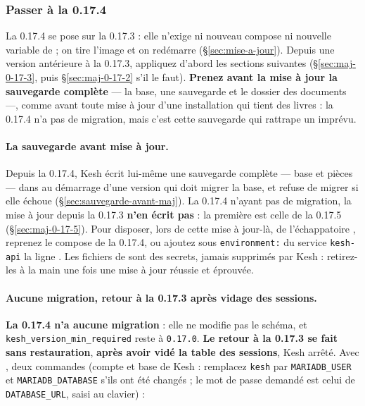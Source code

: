 \documentclass[a4paper,11pt,oneside]{article}
\begin{document}
\subsubsection{Passer à la 0.17.4}\label{sec:maj-0-17-4}

La 0.17.4 se pose sur la 0.17.3 : elle n'exige ni nouveau compose ni nouvelle variable de  ; on tire l'image et on redémarre (\S\ref{sec:mise-a-jour}). Depuis une version antérieure à la 0.17.3, appliquez d'abord les sections suivantes (\S\ref{sec:maj-0-17-3}, puis \S\ref{sec:maj-0-17-2} s'il le faut). \textbf{Prenez avant la mise à jour la sauvegarde complète} --- la base, une sauvegarde  et le dossier des documents ---, comme avant toute mise à jour d'une installation qui tient des livres : la 0.17.4 n'a pas de migration, mais c'est cette sauvegarde qui rattrape un imprévu.

\begin{sloppypar}
\paragraph{La sauvegarde avant mise à jour.} Depuis la 0.17.4, Kesh écrit lui-même une sauvegarde complète --- base et pièces --- dans  au démarrage d'une version qui doit migrer la base, et refuse de migrer si elle échoue (\S\ref{sec:sauvegarde-avant-maj}). La 0.17.4 n'ayant pas de migration, la mise à jour depuis la 0.17.3 \textbf{n'en écrit pas} : la première est celle de la 0.17.5 (\S\ref{sec:maj-0-17-5}). Pour disposer, lors de cette mise à jour-là, de l'échappatoire , reprenez le compose de la 0.17.4, ou ajoutez sous \texttt{environment:} du service \texttt{kesh-api} la ligne . Les fichiers de  sont des secrets, jamais supprimés par Kesh : retirez-les à la main une fois une mise à jour réussie et éprouvée.
\end{sloppypar}

\begin{sloppypar}
\paragraph{Aucune migration, retour à la 0.17.3 après vidage des sessions.} \textbf{La 0.17.4 n'a aucune migration} : elle ne modifie pas le schéma, et \texttt{kesh\_version\_min\_required} reste à \texttt{0.17.0}. \textbf{Le retour à la 0.17.3 se fait sans restauration}, \textbf{après avoir vidé la table des sessions}, Kesh arrêté. Avec , deux commandes (compte et base de Kesh : remplacez \texttt{kesh} par \texttt{MARIADB\_USER} et \texttt{MARIADB\_DATABASE} s'ils ont été changés ; le mot de passe demandé est celui de \texttt{DATABASE\_URL}, saisi au clavier) :
\end{sloppypar}
\end{document}
